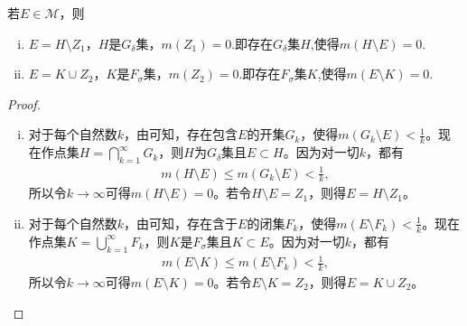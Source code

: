 \documentclass[../../main.tex]{subfiles}%
\begin{document}
\begin{theorem}\label{theorem:定理2.14}
若$E\in\mathscr{M}$，则
\begin{enumerate}[(i)]
\item $E = H\setminus Z_1$，$H$是$G_\delta$集，$m(Z_1)=0$.即存在$G_\delta$集$H$,使得$m(H\setminus E)=0$.

\item $E = K\cup Z_2$，$K$是$F_\sigma$集，$m(Z_2)=0$.即存在$F_\sigma$集$K$,使得$m(E\setminus K)=0$.
\end{enumerate}
\end{theorem}
\begin{proof}
\begin{enumerate}[(i)]
\item 对于每个自然数$k$，由可知，存在包含$E$的开集$G_k$，使得$m(G_k\setminus E)<\frac{1}{k}$。现在作点集$H = \bigcap_{k = 1}^{\infty}G_k$，则$H$为$G_\delta$集且$E\subset H$。因为对一切$k$，都有
\begin{align*}
m(H\setminus E)\leqslant m(G_k\setminus E)<\frac{1}{k},
\end{align*}
所以令$k\to \infty$可得$m(H\setminus E)=0$。若令$H\setminus E = Z_1$，则得$E = H\setminus Z_1$。
\item 对于每个自然数$k$，由可知，存在含于$E$的闭集$F_k$，使得$m(E\setminus F_k)<\frac{1}{k}$。现在作点集$K = \bigcup_{k = 1}^{\infty}F_k$，则$K$是$F_\sigma$集且$K\subset E$。因为对一切$k$，都有
\begin{align*}
m(E\setminus K)\leqslant m(E\setminus F_k)<\frac{1}{k},
\end{align*}
所以令$k\to \infty$可得$m(E\setminus K)=0$。若令$E\setminus K = Z_2$，则得$E = K\cup Z_2$。
\end{enumerate}
\end{proof} 
\end{document}

